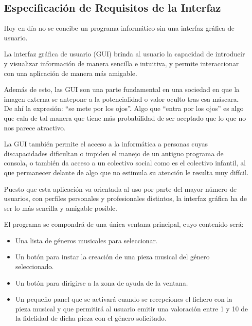 
\subsection{Especificación de Requisitos de la Interfaz}
\label{especificacion-interfaz}
Hoy en día no se concibe un programa informático sin una interfaz gráfica de usuario.

La interfaz gráfica de usuario (GUI) brinda al usuario la capacidad de introducir y visualizar información de manera sencilla e intuitiva, y permite interaccionar con una aplicación de manera más amigable.

Además de esto, las GUI son una parte fundamental en una sociedad en que la imagen externa se antepone a la potencialidad o valor oculto tras esa máscara. De ahí la expresión: ``se mete por los ojos''. Algo que ``entra por los ojos'' es algo que cala de tal manera que tiene más probabilidad de ser aceptado que lo que no nos parece atractivo.

La GUI también permite el acceso a la informática a personas cuyas discapacidades dificultan o impiden el manejo de un antiguo programa de consola, o también da acceso a un colectivo social como es el colectivo infantil, al que permanecer delante de algo que no estimula su atención le resulta muy difícil.

Puesto que esta aplicación va orientada al uso por parte del mayor número de usuarios, con perfiles personales y profesionales distintos, la interfaz gráfica ha de ser lo más sencilla y amigable posible.

El programa se compondrá de una única ventana principal, cuyo contenido será:

\begin{itemize}
    \item Una lista de géneros musicales para seleccionar.
    \item Un botón para instar la creación de una pieza musical del género seleccionado.
    \item Un botón para dirigirse a la zona de ayuda de la ventana.
    \item Un pequeño panel que se activará cuando se recepciones el fichero con la pieza musical y que permitirá al usuario emitir una valoración entre 1 y 10 de la fidelidad de dicha pieza con el género solicitado.
\end{itemize}
